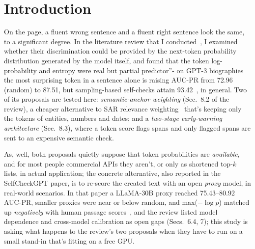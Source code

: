 \documentclass[acmsmall,screen,review,nonacm]{acmart}
\begin{document}

\maketitle

\section{Introduction}

On the page, a fluent wrong sentence and a fluent right sentence look the same, to a significant degree. In the literature review that I conducted~\cite{bhagat2026review}, I examined whether their discrimination could be provided by the next-token probability distribution generated by the model itself, and found that the token log-probability and entropy were \textquotedbllefta real but partial predictor\textquotedblright - on GPT-3 biographies the most surprising token in a sentence alone is raising AUC-PR from 72.96 (random) to 87.51, but sampling-based self-checks attain 93.42~\cite{manakul2023selfcheckgpt}, in general. Two of its proposals are tested here: \emph{semantic-anchor weighting} (Sec.~8.2 of the review), a cheaper alternative to SAR relevance weighting~\cite{duan2024shifting} that's keeping only the tokens of entities, numbers and dates; and a \emph{two-stage early-warning architecture} (Sec.~8.3), where a token score flags spans and only flagged spans are sent to an expensive semantic check.

As, well, both proposals quietly suppose that token probabilities are \emph{available}, and for most people commercial APIs they aren't, or only as shortened top-$k$ lists, in actual application; the concrete alternative, also reported in the SelfCheckGPT paper, is to re-score the created text with an open \emph{proxy} model, in real-world scenarios. In that paper a LLaMA-30B proxy reached 75.43--80.92 AUC-PR, smaller proxies were near or below random, and max($-\log p$) matched up \emph{negatively} with human passage scores~\cite{manakul2023selfcheckgpt}, and the review listed model dependence and cross-model calibration as open gaps (Secs.~6.4, 7); this study is asking what happens to the review's two proposals when they have to run on a small stand-in that's fitting on a free GPU.
\end{document}
